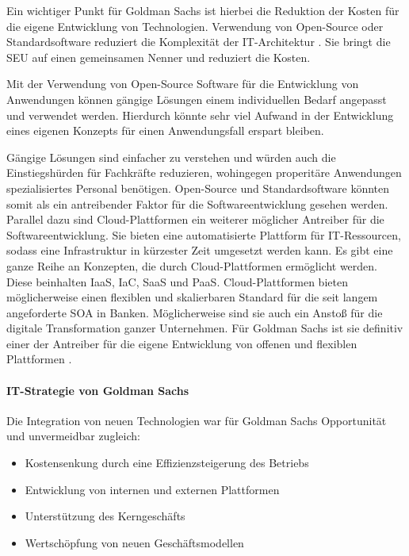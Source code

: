Ein wichtiger Punkt für Goldman Sachs ist hierbei die Reduktion der Kosten für die eigene Entwicklung von Technologien. Verwendung von Open-Source oder Standardsoftware reduziert die Komplexität der IT-Architektur \cite{Bussmann2006}. Sie bringt die \ac{SEU} auf einen gemeinsamen Nenner und reduziert die Kosten. 

Mit der Verwendung von Open-Source Software für die Entwicklung von Anwendungen können gängige Lösungen einem individuellen Bedarf angepasst und verwendet werden. Hierdurch könnte sehr viel Aufwand in der Entwicklung eines eigenen Konzepts für einen Anwendungsfall erspart bleiben.

Gängige Lösungen sind einfacher zu verstehen und würden auch die Einstiegshürden für Fachkräfte reduzieren, wohingegen properitäre Anwendungen spezialisiertes Personal benötigen. Open-Source und Standardsoftware könnten somit als ein antreibender Faktor für die Softwareentwicklung gesehen werden.
\medskip
\\
Parallel dazu sind Cloud-Plattformen ein weiterer möglicher Antreiber für die Softwareentwicklung. Sie bieten eine automatisierte Plattform für IT-Ressourcen, sodass eine Infrastruktur in kürzester Zeit umgesetzt werden kann. Es gibt eine ganze Reihe an Konzepten, die durch Cloud-Plattformen ermöglicht werden. Diese beinhalten \ac{IaaS}, \ac{IaC}, \ac{SaaS} und \ac{PaaS}.
Cloud-Plattformen bieten möglicherweise einen flexiblen und skalierbaren Standard für die seit langem angeforderte \ac{SOA} \cite{Brockhoff2006} in Banken. Möglicherweise sind sie auch ein Anstoß für die digitale Transformation ganzer Unternehmen. Für Goldman Sachs ist sie definitiv einer der Antreiber für die eigene Entwicklung von offenen und flexiblen Plattformen \cite{Gupta:2017}.
%
\paragraph{IT-Strategie von Goldman Sachs}
Die Integration von neuen Technologien war für Goldman Sachs Opportunität und unvermeidbar \cite{Gupta:2017} zugleich:
\begin{itemize}
    \item Kostensenkung durch eine Effizienzsteigerung des Betriebs
    \item Entwicklung von internen und externen Plattformen
    \item Unterstützung des Kerngeschäfts
    \item Wertschöpfung von neuen Geschäftsmodellen
\end{itemize}

